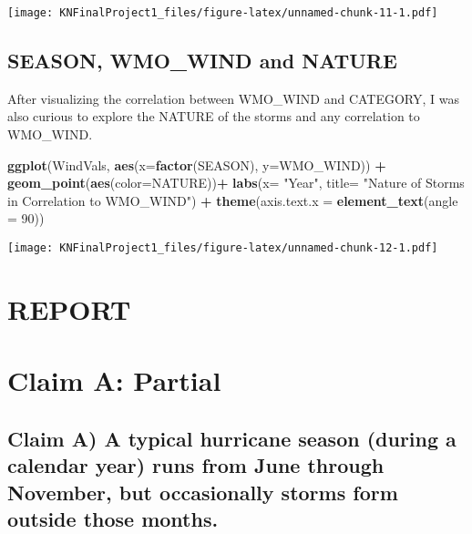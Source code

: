\documentclass[
]{article}
\newenvironment{Shaded}{\begin{snugshade}}{\end{snugshade}}
\newcommand{\DataTypeTok}[1]{\textcolor[rgb]{0.13,0.29,0.53}{#1}}
\newcommand{\DecValTok}[1]{\textcolor[rgb]{0.00,0.00,0.81}{#1}}
\newcommand{\KeywordTok}[1]{\textcolor[rgb]{0.13,0.29,0.53}{\textbf{#1}}}
\newcommand{\NormalTok}[1]{#1}
\newcommand{\OperatorTok}[1]{\textcolor[rgb]{0.81,0.36,0.00}{\textbf{#1}}}
\newcommand{\StringTok}[1]{\textcolor[rgb]{0.31,0.60,0.02}{#1}}
\begin{document}
\texttt{[image: KNFinalProject1\_files/figure-latex/unnamed-chunk-11-1.pdf]}

\hypertarget{season-wmo_wind-and-nature}{%
\subsection{SEASON, WMO\_WIND and
NATURE}\label{season-wmo_wind-and-nature}}

After visualizing the correlation between WMO\_WIND and CATEGORY, I was
also curious to explore the NATURE of the storms and any correlation to
WMO\_WIND.

\begin{Shaded}
\begin{Highlighting}[]
\KeywordTok{ggplot}\NormalTok{(WindVals, }\KeywordTok{aes}\NormalTok{(}\DataTypeTok{x=}\KeywordTok{factor}\NormalTok{(SEASON), }\DataTypeTok{y=}\NormalTok{WMO_WIND)) }\OperatorTok{+}
\StringTok{  }\KeywordTok{geom_point}\NormalTok{(}\KeywordTok{aes}\NormalTok{(}\DataTypeTok{color=}\NormalTok{NATURE))}\OperatorTok{+}\StringTok{ }\KeywordTok{labs}\NormalTok{(}\DataTypeTok{x=} \StringTok{"Year"}\NormalTok{, }\DataTypeTok{title=} \StringTok{"Nature of Storms in Correlation to WMO_WIND"}\NormalTok{) }\OperatorTok{+}
\StringTok{  }\KeywordTok{theme}\NormalTok{(}\DataTypeTok{axis.text.x =} \KeywordTok{element_text}\NormalTok{(}\DataTypeTok{angle =} \DecValTok{90}\NormalTok{)) }
\end{Highlighting}
\end{Shaded}

\texttt{[image: KNFinalProject1\_files/figure-latex/unnamed-chunk-12-1.pdf]}

\hypertarget{report}{%
\section{REPORT}\label{report}}

\hypertarget{claim-a-partial}{%
\section{Claim A: Partial}\label{claim-a-partial}}

\hypertarget{claim-a-a-typical-hurricane-season-during-a-calendar-year-runs-from-june-through-november-but-occasionally-storms-form-outside-those-months.}{%
\subsection{Claim A) A typical hurricane season (during a calendar year)
runs from June through November, but occasionally storms form outside
those
months.}\label{claim-a-a-typical-hurricane-season-during-a-calendar-year-runs-from-june-through-november-but-occasionally-storms-form-outside-those-months.}}
\end{document}
